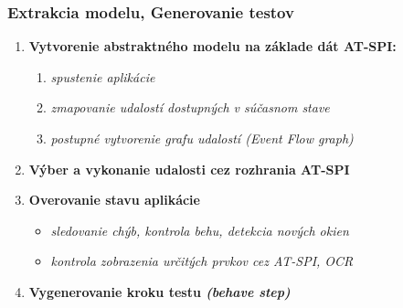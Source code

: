 \documentclass[10pt,xcolor=pdflatex,hyperref={unicode}]{beamer}
\begin{document}
\begin{frame}\frametitle{Extrakcia modelu, Generovanie testov}
\begin{enumerate}
    \item \textbf{Vytvorenie abstraktného modelu na základe dát AT-SPI:}
        \begin{enumerate}
        \item \emph{spustenie aplikácie}
        \item \emph{zmapovanie udalostí dostupných v súčasnom stave}
        \item \emph{postupné vytvorenie grafu udalostí (Event Flow graph)}
    \end{enumerate}
    \vspace{5mm}
    \item \textbf{Výber a vykonanie udalosti cez rozhrania AT-SPI}
    \vspace{5mm}
    \item \textbf{Overovanie stavu aplikácie}
    \begin{itemize}
        \item \emph{sledovanie chýb, kontrola behu, detekcia nových okien}
        \item \emph{kontrola zobrazenia určitých prvkov cez AT-SPI, OCR}
    \end{itemize}
    \vspace{5mm}
    \item \textbf{Vygenerovanie kroku testu \textit{(behave step)}}
\end{enumerate}

    \begin{figure}[h]
        \label{diagram}
    \end{figure}
\end{frame}


\end{document}
